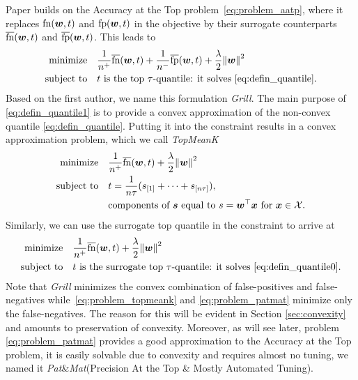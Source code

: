 \documentclass{Thesis}
\newcommand{\Brac}[2][r]{%
  \ifx r#1 \left(       #2 \right)       \else
  \ifx c#1 \left\{      #2 \right\}      \else
  \ifx s#1 \left[       #2 \right]       \else
  \ifx v#1 \left\vert   #2 \right\vert   \else
  \ifx a#1 \left\langle #2 \right\rangle \else
  \ifx t#1 \left\lceil  #2 \right\rceil  \else
  \ifx b#1 \left\lfloor #2 \right\rfloor \else
  \ifx n#1 \left\|      #2 \right\|      \else
  \mathrm{Illegal~option}%
  \fi\fi\fi\fi\fi\fi\fi\fi
}
\newcommand{\Xc}{\mathcal{X}}
\newcommand{\norm}[1]{\Brac[n]{#1}}
\newcommand{\minimize}{\operatorname*{minimize}}
\newcommand{\st}{\operatorname{subject\ to}}
\newcommand{\TopMeanK}{\emph{TopMeanK}\xspace}
\newcommand{\PatMat}{\emph{Pat}\&\emph{Mat}\xspace}
\newcommand{\Grill}{\emph{Grill}\xspace}
\newcommand{\fp}{\textnormal{fp}}
\newcommand{\fn}{\textnormal{fn}}
\newcommand{\fps}{\overline{\textnormal{fp}}}
\newcommand{\fns}{\overline{\textnormal{fn}}}
\begin{document}
Paper \cite{Grill_2016} builds on the Accuracy at the Top problem~\eqref{eq:problem_aatp}, where it replaces $\fn(\bm{w}, t)$ and $\fp(\bm{w}, t)$ in the objective by their surrogate counterparts $\fns(\bm{w}, t)$ and $\fps(\bm{w}, t)$. This leads to
\begin{equation}\label{eq:problem_grill}
  \begin{aligned}
    \minimize
    & \quad \frac{1}{n^{+}}\fns(\bm{w},t) + \frac{1}{n^{-}}\fps(\bm{w},t) + \frac{\lambda}{2}\norm{\bm{w}}^2\\
    \st
    & \quad t\text{ is the top \ensuremath{\tau}-quantile: it solves }\eqref{eq:defin_quantile}.
  \end{aligned}
\end{equation}
Based on the first author, we name this formulation \Grill. The main purpose of \eqref{eq:defin_quantile1} is to provide a convex approximation of the non-convex quantile \eqref{eq:defin_quantile}. Putting it into the constraint results in a convex approximation problem, which we call \TopMeanK
\begin{equation}\label{eq:problem_topmeank}
  \begin{aligned}
    \minimize
    & \quad \frac{1}{n^{+}} \fns(\bm{w},t) + \frac{\lambda}{2}\norm{\bm{w}}^2 \\
    \st
    & \quad t = \frac 1{n\tau}(s_{[1]} + \dots + s_{[n\tau]}), \\
    & \quad \text{components of }\bm{s}\text{ equal to } s = \bm{w}^\top \bm{x} \text{ for } \bm{x} \in \Xc.
  \end{aligned}
\end{equation}
Similarly, we can use the surrogate top quantile in the constraint to arrive at
\begin{equation}\label{eq:problem_patmat}
  \begin{aligned}
    \minimize
    & \quad \frac{1}{n^{+}} \fns(\bm{w},t) + \frac{\lambda}{2}\norm{\bm{w}}^2\\
    \st
    & \quad t \text{ is the surrogate top \ensuremath{\tau}-quantile: it solves }\eqref{eq:defin_quantile0}.
  \end{aligned}
\end{equation}
Note that \Grill minimizes the convex combination of false-positives and false-negatives while~\eqref{eq:problem_topmeank} and \eqref{eq:problem_patmat} minimize only the false-negatives. The reason for this will be evident in Section \ref{sec:convexity} and amounts to preservation of convexity. Moreover, as will see later, problem \eqref{eq:problem_patmat} provides a good approximation to the Accuracy at the Top problem, it is easily solvable due to convexity and requires almost no tuning, we named it \PatMat (Precision At the Top \& Mostly Automated Tuning). 
\end{document}
